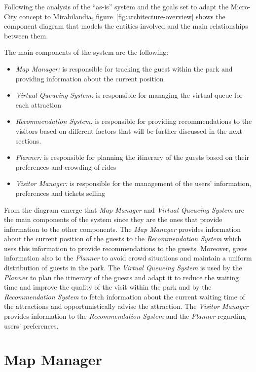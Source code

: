 Following the analysis of the ``as-is'' system and the goals set to adapt the Micro-City concept to Mirabilandia,
figure~\ref{fig:architecture-overview} shows the component diagram that models the entities involved and the main relationships between them. %

The main components of the system are the following:

\begin{itemize}
	\item \textit{Map Manager:} is responsible for tracking the guest within the park and providing information about the current position
	\item \textit{Virtual Queueing System:} is responsible for managing the virtual queue for each attraction
	\item \textit{Recommendation System:} is responsible for providing recommendations to the visitors based on different factors that will be further discussed in the next sections.
	\item \textit{Planner:} is responsible for planning the itinerary of the guests based on their preferences and crowding of rides
	\item \textit{Visitor Manager:} is responsible for the management of the users' information, preferences and tickets selling
\end{itemize}

From the diagram emerge that \textit{Map Manager} and \textit{Virtual Queueing System} are the main components of the system since they are the ones
that provide information to the other components. The \textit{Map Manager} provides information about the current position of the guests to the
\textit{Recommendation System} which uses this information to provide recommendations to the guests. Moreover, gives information also to the
\textit{Planner} to avoid crowd situations and maintain a uniform distribution of guests in the park. The \textit{Virtual Queueing System} is used by
the \textit{Planner} to plan the itinerary of the guests and adapt it to reduce the waiting time and improve the quality of the visit within the park
and by the \textit{Recommendation System} to fetch information about the current waiting time of the attractions and opportunistically advise the
attraction. The \textit{Visitor Manager} provides information to the \textit{Recommendation System} and the \textit{Planner} regarding users'
preferences.

\section{Map Manager}

